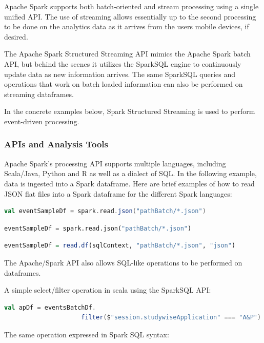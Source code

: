 \documentclass[runningheads,a4paper]{llncs}
\begin{document}
Apache Spark supports both batch-oriented and stream processing using a single unified API.  The use of streaming allows essentially up to the second processing to be done on the analytics data as it arrives from the users mobile devices, if desired.

The Apache Spark Structured Streaming API mimics the Apache Spark batch API, but behind the scenes it utilizes the SparkSQL engine to continuously update data as new information arrives. The same SparkSQL queries and operations that work on batch loaded information can also be performed on streaming dataframes.

In the concrete examples below, Spark Structured Streaming is used to perform event-driven processing.

\subsubsection{APIs and Analysis Tools}

Apache Spark's processing API supports multiple languages, including Scala/Java, Python and R as well as a dialect of SQL.  In the following example, data is ingested into a Spark dataframe. Here are brief examples of how to read JSON flat files into a Spark dataframe for the different Spark languages:

\begin{lstlisting}[language=Scala, basicstyle = \small, caption={Scala}]
 val eventSampleDf = spark.read.json("pathBatch/*.json")
\end{lstlisting}%
\begin{lstlisting}[language=Python, basicstyle = \small, caption={Pyspark (Python)}]
 eventSampleDf = spark.read.json("pathBatch/*.json")
\end{lstlisting}
\begin{lstlisting}[language=R, basicstyle = \small, caption={SparkR (R)}]
 eventSampleDf = read.df(sqlContext, "pathBatch/*.json", "json")
\end{lstlisting}

The Apache/Spark API also allows SQL-like operations to be performed on dataframes.

A simple select/filter operation in scala using the SparkSQL API:
\begin{lstlisting}[language=Scala, basicstyle =\small, caption={SQL query using Scala}]
 val apDf = eventsBatchDf.
                     filter($"session.studywiseApplication" === "A&P")
\end{lstlisting}%
The same operation expressed in Spark SQL syntax:
\begin{lstlisting}[language=SQL, basicstyle = \small, caption={SQL query directly in Spark SQL}]
  %sql select * from apDf where session.studywiseApplication = 'A&P'
\end{lstlisting}%
\end{document}
